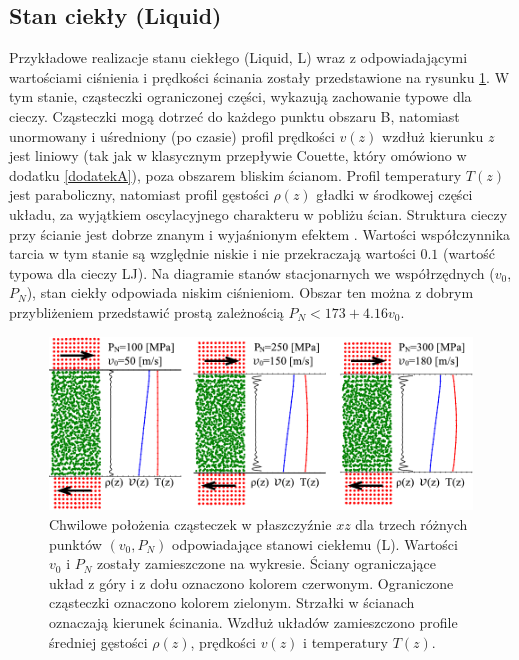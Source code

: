 \documentclass[12pt,a4paper,openright]{report} %
\begin{document}
\subsection{Stan ciekły (Liquid)}
Przykładowe realizacje stanu ciekłego (Liquid, L) wraz z odpowiadającymi wartościami ciśnienia i prędkości ścinania zostały przedstawione na rysunku \ref{liquid}. W tym stanie, cząsteczki ograniczonej części, wykazują zachowanie typowe dla cieczy. Cząsteczki mogą dotrzeć do każdego punktu obszaru B, natomiast unormowany i uśredniony (po czasie) profil prędkości $v(z)$ wzdłuż kierunku $z$ jest liniowy (tak jak w klasycznym przepływie Couette, który omówiono w dodatku \ref{dodatekA}), poza obszarem bliskim ścianom. Profil temperatury $T(z)$ jest paraboliczny, natomiast profil gęstości $\rho(z)$ gładki w środkowej części układu, za wyjątkiem oscylacyjnego charakteru w pobliżu ścian. Struktura cieczy przy ścianie jest dobrze znanym i wyjaśnionym efektem \cite{Ladd1977, Cape1982}. Wartości współczynnika tarcia w tym stanie są względnie niskie i nie przekraczają wartości $0.1$ (wartość typowa dla cieczy LJ). Na diagramie stanów stacjonarnych we współrzędnych ($v_0$, $P_N$), \linebreak stan ciekły odpowiada niskim ciśnieniom. Obszar ten można z dobrym przybliżeniem przedstawić prostą zależnością $P_N < 173 + 4.16 v_0$.  
%
\begin{figure}
\centering
\includegraphics[width=160mm]{rysunki/PRE16_fig2.pdf}
\caption{Chwilowe położenia cząsteczek w płaszczyźnie $xz$ dla trzech różnych punktów $(v_0, P_N)$ odpowiadające stanowi ciekłemu (L). Wartości $v_0$ i $P_N$ zostały zamieszczone na wykresie. Ściany ograniczające układ z góry i z dołu oznaczono kolorem czerwonym. Ograniczone cząsteczki oznaczono kolorem  zielonym. Strzałki w ścianach oznaczają kierunek ścinania. Wzdłuż układów zamieszczono profile średniej gęstości $\rho(z)$, prędkości $v(z)$ i temperatury $T(z)$.}
\label{liquid}
\end{figure}
%
%
\end{document}
